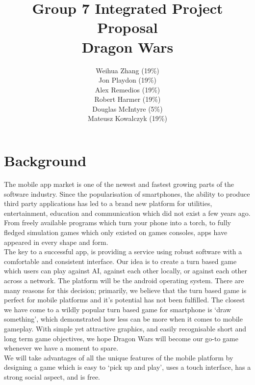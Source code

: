 \documentclass[10pt,a4paper,oneside]{report}
\begin{document}
\title{Group 7 Integrated Project Proposal\\Dragon Wars}

\author{Weihua Zhang (19\%)\\
        Jon Playdon (19\%)\\
        Alex Remedios (19\%)\\
        Robert Harmer (19\%)\\
        Douglas McIntyre (5\%)\\
        Mateusz Kowalczyk (19\%)}
\maketitle
\section*{Background}

The mobile app market is one of the newest and fastest growing parts of the software industry. Since the popularisation of smartphones, the ability to produce third party applications has led to a brand new platform for utilities, entertainment, education and communication which did not exist a few years ago. From freely available programs which turn your phone into a torch, to fully fledged simulation games which only existed on games consoles, apps have appeared in every shape and form.\\


The key to a successful app, is providing a service using robust software with a comfortable and consistent interface. Our idea is to create a turn based game which users can play against AI, against each other locally, or against each other across a network. The platform will be the android operating system. There are many reasons for this decision; primarily, we believe that the turn based game is perfect for mobile platforms and it’s potential has not been fulfilled. The closest we have come to a wildly popular turn based game for smartphone is ‘draw something’, which demonstrated how less can be more when it comes to mobile gameplay. With simple yet attractive graphics, and easily recognisable short and long term game objectives, we hope Dragon Wars will become our go-to game whenever we have a moment to spare.\\
We will take advantages of all the unique features of the mobile platform by designing a game which is easy to ‘pick up and play’, uses a touch interface, has a strong social aspect, and is free.\\
\end{document}
